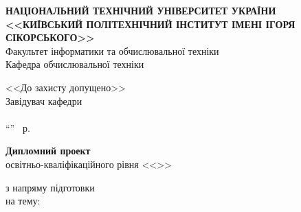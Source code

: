 \documentclass[main.tex]{subfiles}
\begin{document}
\begin{specialpage}
  \MakeUppercase{\textbf{Національний технічний університет України <<Київський політехнічний інститут імені Ігоря Сікорського>>}}\\
  \vspace{2mm}
  Факультет інформатики та обчислювальної техніки\\
  \vspace{2mm}
  Кафедра обчислювальної техніки

  \vspace{1cm}

  \hfill\begin{minipage}{0.35\linewidth}
  \begin{flushleft}
      <<До захисту допущено>>\\
      Завідувач кафедри\\
      \fillin[(підпис)]{\hspace{2.2cm}} \\
      ``\fillin{\phantom{99}}''\fillin{\hspace{3cm}} ~р.
  \end{flushleft}
  \end{minipage}

  \vspace{1cm}

  \textbf{\Large Дипломний проект}\\
  освітньо-кваліфікаційного рівня <<>>\\
  \begin{flushleft}
  з напряму підготовки \uline{\hfill\mbox{}}\\
  на тему: \fillin{\thesistitle\hfill\mbox{}}\\
  \uline{\mbox{}\hfill\mbox{}}\\
  \uline{\mbox{}\hfill\mbox{}}

  \vspace{1cm}


\end{flushleft}
\end{specialpage}
\end{document}
